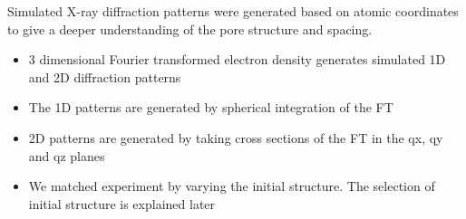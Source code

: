 \documentclass{article}
\begin{document}
	Simulated X-ray diffraction patterns were generated based on atomic coordinates to give a deeper understanding of the pore structure and spacing. 
        \begin{itemize}
               \item 3 dimensional Fourier transformed electron density generates simulated 1D and 2D diffraction patterns
               \item The 1D patterns are generated by spherical integration of the FT
               \item 2D patterns are generated by taking cross sections of the FT in the qx, qy and qz planes
               \item We matched experiment by varying the initial structure. The selection of initial structure is explained later
        \end{itemize}
\end{document}
